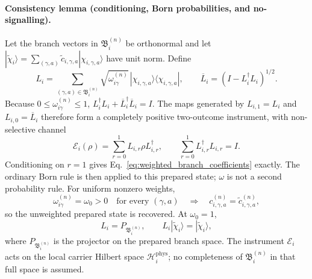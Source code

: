 \paragraph{Consistency lemma (conditioning, Born probabilities, and no-signalling).}
Let the branch vectors in $\mathfrak B_i^{(n)}$ be orthonormal and let
$|\widetilde\chi_i\rangle=\sum_{(\gamma,a)}
\widetilde c_{i,\gamma,a}|\chi_{i,\gamma,a}\rangle$ have unit norm. Define
\begin{equation}
  L_i=\sum_{(\gamma,a)\in\mathfrak B_i^{(n)}}
    \sqrt{\omega_{i\gamma}^{(n)}}\,
    |\chi_{i,\gamma,a}\rangle\langle\chi_{i,\gamma,a}|,
  \qquad
  \overline L_i=\left(I-L_i^\dagger L_i\right)^{1/2}.
  \label{eq:weighted_filter_instrument}
\end{equation}
Because $0\leq\omega_{i\gamma}^{(n)}\leq1$,
$L_i^\dagger L_i+\overline L_i^\dagger\overline L_i=I$. The maps generated by
$L_{i,1}=L_i$ and $L_{i,0}=\overline L_i$ therefore form a completely positive
two-outcome instrument, with non-selective channel
\begin{equation}
  \mathcal E_i(\rho)=\sum_{r=0}^{1}L_{i,r}\rho L_{i,r}^\dagger,
  \qquad
  \sum_{r=0}^{1}L_{i,r}^\dagger L_{i,r}=I.
  \label{eq:weighted_filter_channel}
\end{equation}
Conditioning on $r=1$ gives Eq.~\eqref{eq:weighted_branch_coefficients} exactly.
The ordinary Born rule is then applied to this prepared state; $\omega$ is not a
second probability rule. For uniform nonzero weights,
\begin{equation}
  \omega_{i\gamma}^{(n)}=\omega_0>0\quad\text{for every }(\gamma,a)
  \quad\Longrightarrow\quad
  c_{i,\gamma,a}^{(n)}=\widetilde c_{i,\gamma,a}^{(n)},
  \label{eq:weighted_standard_limit}
\end{equation}
so the unweighted prepared state is recovered. At $\omega_0=1$,
\begin{equation}
  L_i=P_{\mathfrak B_i^{(n)}},
  \qquad
  L_i|\widetilde\chi_i\rangle=|\widetilde\chi_i\rangle,
  \label{eq:weighted_unit_projector}
\end{equation}
where $P_{\mathfrak B_i^{(n)}}$ is the projector on the prepared branch space. The
instrument $\mathcal E_i$ acts on the local carrier Hilbert space
$\mathcal H_i^{\mathrm{phys}}$; no completeness of $\mathfrak B_i^{(n)}$ in that full
space is assumed.

